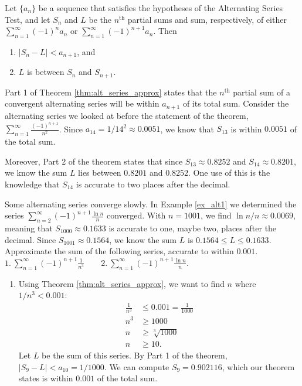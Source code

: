 \documentclass[10pt]{article}
\newcommand{\ds}{\displaystyle}
\begin{document}
{Let $\{a_n\}$ be a sequence that satisfies the hypotheses of the Alternating Series Test, and let $S_n$ and $L$ be the $n^{\text{th}}$ partial sums and sum, respectively, of either $\ds \sum_{n=1}^\infty (-1)^{n}a_n$ or $\ds \sum_{n=1}^\infty (-1)^{n+1}a_n$. Then
\begin{enumerate}
	\item $|S_n-L| < a_{n+1}$, and
	\item	$L$ is between $S_n$ and $S_{n+1}$.
\end{enumerate}

Part 1 of Theorem \ref{thm:alt_series_approx} states that the $n^{\text{th}}$ partial sum of a convergent alternating series will be within $a_{n+1}$ of its total sum. Consider the alternating series we looked at before the statement of the theorem, $\ds \sum_{n=1}^\infty \frac{(-1)^{n+1}}{n^2}$. Since $a_{14} = 1/14^2 \approx 0.0051$, we know that $S_{13}$ is within $0.0051$ of the total sum. 

Moreover, Part 2 of the theorem states that since $S_{13} \approx 0.8252$ and $S_{14}\approx 0.8201$, we know the sum $L$ lies between $0.8201$ and $0.8252$. One use of this is the knowledge that $S_{14}$ is accurate to two places after the decimal.

Some alternating series converge slowly. In Example \ref{ex_alt1} we determined the series $\ds\sum_{n=2}^\infty (-1)^{n+1}\frac{\ln n}{n}$ converged. With $n=1001$, we find $\ln n/n \approx 0.0069$, meaning that $S_{1000} \approx 0.1633$ is accurate to one, maybe two, places after the decimal. Since $S_{1001} \approx 0.1564$, we know the sum $L$ is $0.1564\leq L\leq0.1633$.\\

{
Approximate the sum of the following series, accurate to within $0.001$.\\

\noindent$\ds 1.\ \sum_{n=1}^\infty (-1)^{n+1}\frac{1}{n^3}\qquad 2.\ \sum_{n=1}^\infty (-1)^{n+1}\frac{\ln n}{n}$.
}
{\begin{enumerate}
	\item  Using Theorem \ref{thm:alt_series_approx}, we want to find $n$ where $1/n^3 < 0.001$:
	\begin{align*}
	\frac1{n^3} &\leq 0.001=\frac{1}{1000} \\
	n^3 &\geq 1000\\
	n &\geq \sqrt[3]{1000}\\
	n &\geq 10.
	\end{align*}
	Let $L$ be the sum of this series. By Part 1 of the theorem, $|S_9-L|<a_{10} = 1/1000$. We can compute $S_9=0.902116$, which our theorem states is within $0.001$ of the total sum. 
	

\end{enumerate}}}
\end{document}

